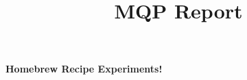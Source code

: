 \documentclass[letterpaper, 12pt]{article}
\title{MQP Report}
\begin{document}
	\begin{titlepage}
		\centering
		\LARGE
		\textbf{Homebrew Recipe Experiments!}
	\end{titlepage}

	\tableofcontents
	
	
	
\end{document}
